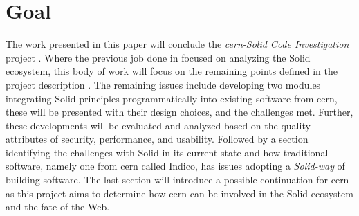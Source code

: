 \section{Goal}

The work presented in this paper will conclude the \textit{\gls{cern}-Solid Code Investigation} project \cite{cern-solid-code-investigation-project-description}. Where the previous job done in \cite{cern-solid-investigation-spec} focused on analyzing the Solid ecosystem, this body of work will focus on the remaining points defined in the project description \cite{cern-solid-code-investigation-project-description}. The remaining issues include developing two modules integrating Solid principles programmatically into existing software from \gls{cern}, these will be presented with their design choices, and the challenges met. Further, these developments will be evaluated and analyzed based on the quality attributes of security, performance, and usability. Followed by a section identifying the challenges with Solid in its current state and how traditional software, namely one from \gls{cern} called Indico, has issues adopting a \textit{Solid-way} of building software. The last section will introduce a possible continuation for \gls{cern} as this project aims to determine how \gls{cern} can be involved in the Solid ecosystem and the fate of the Web.
